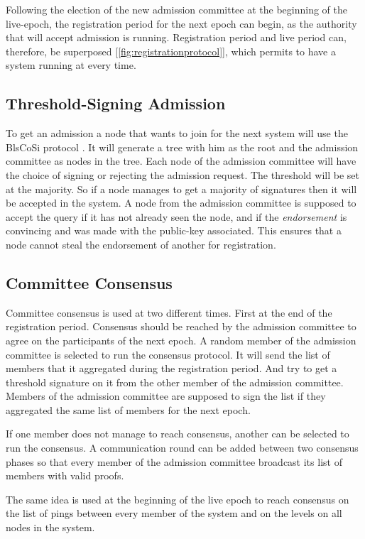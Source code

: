 \documentclass[a4paper,11pt,oneside]{report}
\begin{document}
Following the election of the new admission committee at the beginning of the
live-epoch, the registration period for the next epoch can begin, as the
authority that will accept admission is running. Registration period and live
period can, therefore, be superposed [\autoref{fig:registrationprotocol}], which
permits to have a system running at every time. 

\subsection{Threshold-Signing Admission}
To get an admission a node that wants to join for the next system will use the
BlsCoSi protocol \cite{Boneh2018}. It will generate a tree with him as
the root and the admission committee as nodes in the tree. Each node of the
admission committee will have the choice of signing or rejecting the admission
request. The threshold will be set at the majority. So if a node manages to get a
majority of signatures then it will be accepted in the system. A node from the
admission committee is supposed to accept the query if it has not already seen
the node, and if the \textit{endorsement} is convincing and was made with the public-key
associated. This ensures that a node cannot steal the endorsement of another
for registration.  

\subsection{Committee Consensus}
Committee consensus is used at two different times. First at the end of the
registration period. Consensus should be reached by the admission committee to agree on
the participants of the next epoch. A random member of the admission committee
is selected to run the consensus protocol. It will send the list of members
that it aggregated during the registration period. And try to get a threshold
signature on it from the other member of the admission committee. Members of
the admission committee are supposed to sign the list if they aggregated the
same list of members for the next epoch.

If one member does not manage to reach consensus, another can be selected to
run the consensus. A communication round can be added between two consensus
phases so that every member of the admission committee broadcast its list
of members with valid proofs.

The same idea is used at the beginning of the live epoch to reach consensus on
the list of pings between every member of the system and on the levels on all
nodes in the system.
\end{document}

